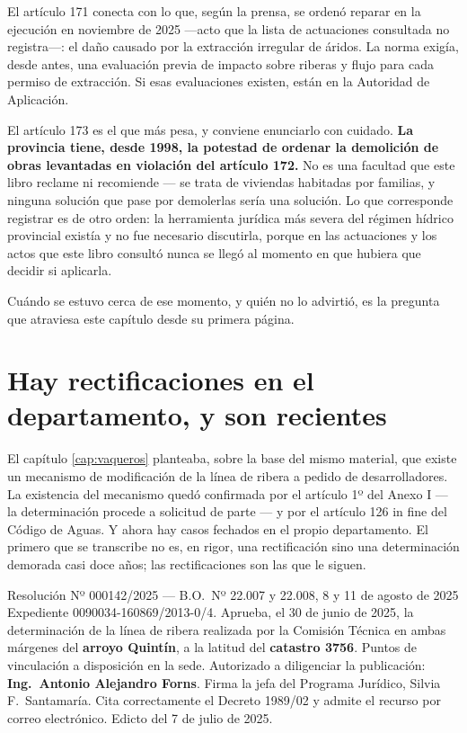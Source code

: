 El artículo 171 conecta con lo que, según la prensa, se ordenó reparar en la ejecución en noviembre de 2025 ---acto que la lista de actuaciones consultada no registra---: el daño causado por la extracción irregular de áridos. La norma exigía, desde antes, una evaluación previa de impacto sobre riberas y flujo para cada permiso de extracción. Si esas evaluaciones existen, están en la Autoridad de Aplicación.

El artículo 173 es el que más pesa, y conviene enunciarlo con cuidado. \textbf{La provincia tiene, desde 1998, la potestad de ordenar la demolición de obras levantadas en violación del artículo 172.} No es una facultad que este libro reclame ni recomiende --- se trata de viviendas habitadas por familias, y ninguna solución que pase por demolerlas sería una solución. Lo que corresponde registrar es de otro orden: la herramienta jurídica más severa del régimen hídrico provincial existía y no fue necesario discutirla, porque en las actuaciones y los actos que este libro consultó nunca se llegó al momento en que hubiera que decidir si aplicarla.

Cuándo se estuvo cerca de ese momento, y quién no lo advirtió, es la pregunta que atraviesa este capítulo desde su primera página.

\section{Hay rectificaciones en el departamento, y son recientes}

El capítulo \ref{cap:vaqueros} planteaba, sobre la base del mismo material, que existe un mecanismo de modificación de la línea de ribera a pedido de desarrolladores. La existencia del mecanismo quedó confirmada por el artículo 1º del Anexo I --- la determinación procede a solicitud de parte --- y por el artículo 126 in fine del Código de Aguas. Y ahora hay casos fechados en el propio departamento. El primero que se transcribe no es, en rigor, una rectificación sino una determinación demorada casi doce años; las rectificaciones son las que le siguen.

\begin{ficha}{Resolución Nº 000142/2025 --- B.O.\ Nº 22.007 y 22.008, 8 y 11 de agosto de 2025}
Expediente 0090034-160869/2013-0/4. Aprueba, el 30 de junio de 2025, la determinación de la línea de ribera realizada por la Comisión Técnica en ambas márgenes del \textbf{arroyo Quintín}, a la latitud del \textbf{catastro 3756}. Puntos de vinculación a disposición en la sede. Autorizado a diligenciar la publicación: \textbf{Ing.\ Antonio Alejandro Forns}. Firma la jefa del Programa Jurídico, Silvia F.\ Santamaría. Cita correctamente el Decreto 1989/02 y admite el recurso por correo electrónico. Edicto del 7 de julio de 2025.
\end{ficha}

